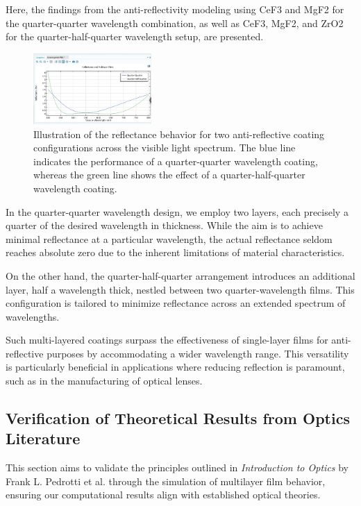 Here, the findings from the anti-reflectivity modeling using CeF3 and MgF2 for the quarter-quarter wavelength combination, as well as CeF3, MgF2, and ZrO2 for the quarter-half-quarter wavelength setup, are presented.

\begin{figure}[ht!]
  \centering
  \includegraphics[width=0.4\textwidth]{Chapters/Figures/Chapter 4 Figures/Quarter-Half-Quarter.png}
  \caption{Illustration of the reflectance behavior for two anti-reflective coating configurations across the visible light spectrum. The blue line indicates the performance of a quarter-quarter wavelength coating, whereas the green line shows the effect of a quarter-half-quarter wavelength coating.}
  \label{fig:both quarter-quarter and quarter-half-quarter}
\end{figure}

In the quarter-quarter wavelength design, we employ two layers, each precisely a quarter of the desired wavelength in thickness. While the aim is to achieve minimal reflectance at a particular wavelength, the actual reflectance seldom reaches absolute zero due to the inherent limitations of material characteristics.

On the other hand, the quarter-half-quarter arrangement introduces an additional layer, half a wavelength thick, nestled between two quarter-wavelength films. This configuration is tailored to minimize reflectance across an extended spectrum of wavelengths.

Such multi-layered coatings surpass the effectiveness of single-layer films for anti-reflective purposes by accommodating a wider wavelength range. This versatility is particularly beneficial in applications where reducing reflection is paramount, such as in the manufacturing of optical lenses.

\subsection{Verification of Theoretical Results from Optics Literature}

This section aims to validate the principles outlined in \emph{Introduction to Optics} by Frank L. Pedrotti et al. through the simulation of multilayer film behavior, ensuring our computational results align with established optical theories.

